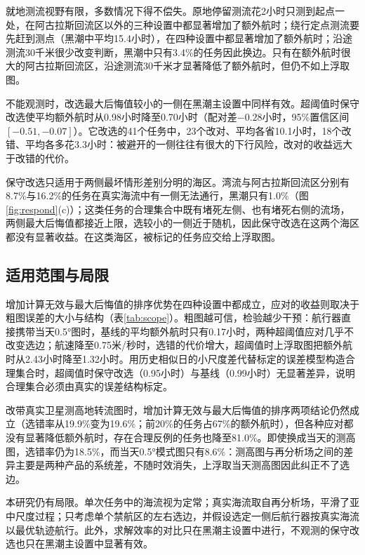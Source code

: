 就地测流视野有限，多数情况下得不偿失。原地停留测流花2小时只测到起点一处，在阿古拉斯回流区以外的三种设置中都显著增加了额外航时；绕行定点测流要先赶到测点（黑潮中平均15.4小时），在四种设置中都显著增加了额外航时；沿途测流30千米很少改变判断，黑潮中只有3.4\%的任务因此换边。只有在额外航时很大的阿古拉斯回流区，沿途测流30千米才显著降低了额外航时，但仍不如上浮取图。

不能观测时，改选最大后悔值较小的一侧在黑潮主设置中同样有效。超阈值时保守改选使平均额外航时从0.98小时降至0.70小时（配对差$-0.28$小时，95\%置信区间$[-0.51, -0.07]$）。它改选的41个任务中，23个改对、平均各省10.1小时，18个改错、平均各多花3.3小时：被避开的一侧往往有很大的下行风险，改对的收益远大于改错的代价。

保守改选只适用于两侧最坏情形差别分明的海区。湾流与阿古拉斯回流区分别有8.7\%与16.2\%的任务在真实海流中有一侧无法通行，黑潮只有1.0\%（图\ref{fig:respond}(c)）；这类任务的合理集合中既有堵死左侧、也有堵死右侧的流场，两侧最大后悔值都接近上限，选较小的一侧近于随机，因此保守改选在这两个海区都没有显著收益。在这类海区，被标记的任务应交给上浮取图。

\subsection{适用范围与局限}
\label{sec:scope}
增加计算无效与最大后悔值的排序优势在四种设置中都成立，应对的收益则取决于粗图误差的大小与结构（表\ref{tab:scope}）。粗图越可信，检验越少干预：航行器直接携带当天0.5°图时，基线的平均额外航时只有0.17小时，两种超阈值应对几乎不改变选边；航速降至0.75米/秒时，选错的代价增大，超阈值时上浮取图把额外航时从2.43小时降至1.32小时。用历史相似日的小尺度差代替标定的误差模型构造合理集合时，超阈值时保守改选（0.95小时）与基线（0.99小时）无显著差异，说明合理集合必须由真实的误差结构标定。

\begin{table}[tb]
\centering
\caption{各设置下的测试年份结果（额外航时单位：小时；上浮指取当天0.5°图，每次计1小时；改带卫星测高地转流图一行的上浮为理想参照）。}
\label{tab:scope}
\small

\end{table}

改带真实卫星测高地转流图时，增加计算无效与最大后悔值的排序两项结论仍然成立（选错率从19.9\%变为19.6\%；前20\%的任务占67\%的额外航时），但各种应对都没有显著降低额外航时，存在合理反例的任务也降至81.0\%。即使换成当天的测高图，选错率仍为18.5\%，而当天0.5°模式图只有8.6\%：测高图与再分析场之间的差异主要是两种产品的系统差，不随时效消失，上浮取当天测高图因此纠正不了选边。

本研究仍有局限。单次任务中的海流视为定常；真实海流取自再分析场，平滑了亚中尺度过程；只考虑单个禁航区的左右选边，并假设选定一侧后航行器按真实海流以最优轨迹航行。此外，求解效率的对比只在黑潮主设置中进行，不观测的保守改选也只在黑潮主设置中显著有效。
